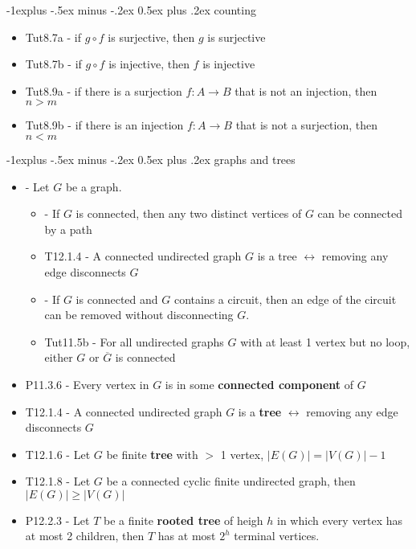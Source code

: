 \documentclass[10pt, landscape]{article}
\makeatletter
\renewcommand{\subsection}{\@startsection{subsection}{2}{0mm}%
                                {-1explus -.5ex minus -.2ex}%
                                {0.5ex plus .2ex}%
                                {\normalfont\normalsize\bfseries}}
\renewcommand{\bf}[1]{\textbf{#1}}
\let\iff\leftrightarrow
\let\then\rightarrow
\makeatother
\begin{document}
\begin{multicols}{3}
    \subsection{counting}
    \begin{itemize}
        \item Tut8.7a - if $g \circ f$ is surjective, then $g$ is surjective
        \item Tut8.7b - if $g \circ f$ is injective, then $f$ is injective
        \item Tut8.9a - if there is a surjection $f : A \then B$ that is not an injection, then $n > m$
        \item Tut8.9b - if there is an injection $f : A \then B$ that is not a surjection, then $n < m$
    \end{itemize}

    \subsection{graphs and trees}
    \begin{itemize}
        \item - Let $G$ be a graph.
        \begin{itemize}
            \item - If $G$ is connected, then any two distinct vertices of $G$ can be connected by a path
            \item T12.1.4 - A connected undirected graph $G$ is a tree $\iff$ removing any edge disconnects $G$
            \item - If $G$ is connected and $G$ contains a circuit, then an edge of the circuit can be removed without disconnecting $G$.
            \item Tut11.5b - For all undirected graphs $G$ with at least 1 vertex but no loop, either $G$ or $\overline G$ is connected
        \end{itemize}
        \item P11.3.6 -  Every vertex in $G$ is in some \bf{connected component} of $G$
        \item T12.1.4 - A connected undirected graph $G$ is a \bf{tree} $\iff$ removing any edge disconnects $G$
        \item T12.1.6 - Let $G$ be finite \bf{tree} with $>$ 1 vertex, $|E(G)| = |V(G)| - 1$
        \item T12.1.8 - Let $G$ be a connected cyclic finite undirected graph, then $|E(G)| \geq |V(G)|$
        \item P12.2.3 - Let $T$ be a finite \bf{rooted tree} of heigh $h$ in which every vertex has at most 2 children, then $T$ has at most $2^h$ terminal vertices.

\end{itemize}
\end{multicols}
\end{document}
